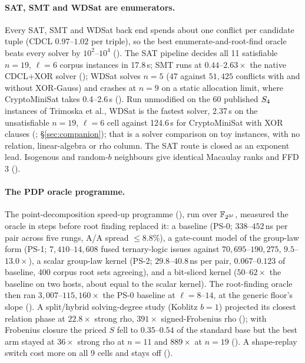 \paragraph{SAT, SMT and WDSat are enumerators.} Every SAT, SMT and WDSat
back end spends about one conflict per candidate tuple (CDCL $0.97$--$1.02$
per triple), so the best enumerate-and-root-find oracle beats every solver
by $10^2$--$10^4$
().
The SAT pipeline decides all 11 satisfiable $n=19$, $\ell=6$ corpus
instances in 17.8\,s; SMT runs at $0.44$--$2.63\times$ the native CDCL+XOR
solver (); WDSat solves $n=5$
($47$ against $51{,}425$ conflicts with and without XOR-Gauss) and crashes
at $n=9$ on a static allocation limit, where CryptoMiniSat takes
0.4--2.6\,s (). Run unmodified on the 60
published $S_{4}$ instances of Trimoska et al., WDSat is the fastest solver,
2.37\,s on the unsatisfiable $n=19$, $\ell=6$ cell against 124.6\,s for
CryptoMiniSat with XOR clauses (;
\S\ref{sec:companion}); that is a solver comparison on toy instances, with
no relation, linear-algebra or rho column. The SAT route is closed as an
exponent lead. Isogenous and random-$b$ neighbours give identical
Macaulay ranks and FFD 3 ().

\paragraph{The PDP oracle programme.} The point-decomposition speed-up
programme (), run over
$\mathbb{F}_{2^{3\ell}}$, measured the oracle in steps before root finding replaced
it: a baseline (PS-0; $338$--$452$\,ns per pair across five rungs, A/A
spread $\le8.8\%$), a gate-count model of the group-law form (PS-1;
$7{,}410$--$14{,}608$ fused ternary-logic issues against
$70{,}695$--$190{,}275$, $9.5$--$13.0\times$), a scalar group-law kernel (PS-2;
$29.8$--$40.8$\,ns per pair, $0.067$--$0.123$ of baseline, 400 corpus root
sets agreeing), and a bit-sliced kernel ($50$--$62\times$ the baseline on two
hosts, about equal to the scalar kernel). The root-finding oracle then ran
$3{,}007$--$115{,}160\times$ the PS-0 baseline at $\ell=8$--$14$, at the generic
floor's slope (). A split/hybrid
solving-degree study (Koblitz $b=1$) projected its closest relation phase at
$22.8\times$ strong rho, $391\times$ signed-Frobenius rho
(); with Frobenius closure the priced
$S$ fell to $0.35$--$0.54$ of the standard base but the best arm stayed at
$36\times$ strong rho at $n=11$ and $889\times$ at $n=19$
(). A shape-replay switch cost more
on all 9 cells and stays off ().

